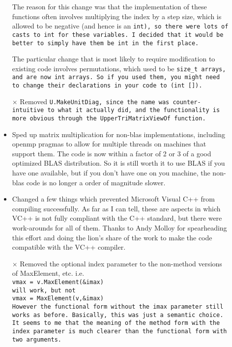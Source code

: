 \begin{description}
\begin{itemize}
The reason for this change
was that the implementation of these
functions often involves multiplying the index
by a step size, which is allowed to be negative (and hence
is an \tt{int}), so there were lots of casts to \tt{int} for these variables.
I decided that it would be better to simply have them be \tt{int} in the first place.

The particular change that is most likely to require modification to existing code
involves permutations, which used to be \tt{size\_t} arrays, and are now
\tt{int} arrays.  So if you used them, you might need to change their
declarations in your code to \tt{(int [])}.
\item[$\times$]
Removed \tt{U.MakeUnitDiag}, since the name was counter-intuitive to what it actually did, and the functionality is more obvious through the
\tt{UpperTriMatrixViewOf} function.
\item
Sped up matrix multiplication for non-blas implementations, including
openmp pragmas to allow for multiple threads on machines that support them.
The code is now within a factor of 2 or 3 of a good optimized BLAS 
distribution.  So it is still worth it to use BLAS if you have one available,
but if you don't have one on you machine, the non-blas code is no longer a
order of magnitude slower.
\item
Changed a few things which prevented Microsoft Visual C++ from compiling successfully.  
As far as I can tell, these are aspects in which VC++ is not fully compliant with the C++ 
standard, but there were work-arounds for all of them.
Thanks to Andy Molloy
for spearheading this effort and doing the lion's share of the work to make
the code compatible with the VC++ compiler.
\item[$\times$]
Removed the optional index parameter to the non-method versions of 
MaxElement, etc.   i.e.\\
\tt{vmax = v.MaxElement(\&imax)}\\
will work, but not\\
\tt{vmax = MaxElement(v,\&imax)}\\
However the functional form without the \tt{imax} parameter still works as before.
Basically, this was just a semantic choice.  It seems to me that the meaning of the method
form with the index parameter is much clearer than the functional form with two arguments.


\end{itemize}
\end{description}
